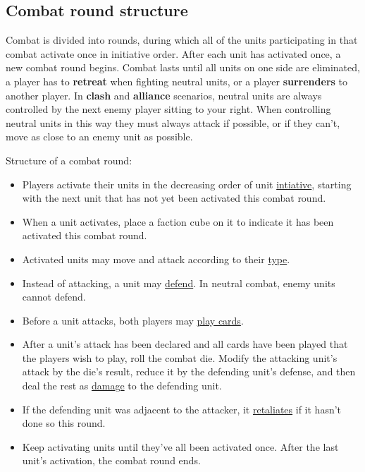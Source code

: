 \subsection*{Combat round structure}
Combat is divided into rounds, during which all of the units participating in that combat activate once in initiative order.
After each unit has activated once, a new combat round begins.
Combat lasts until all units on one side are eliminated, a player has to \textbf{retreat} when fighting neutral units, or a player \textbf{surrenders} to another player.
In \textbf{clash} and \textbf{alliance} scenarios, neutral units are always controlled by the next enemy player sitting to your right.
When controlling neutral units in this way they must always attack if possible, or if they can't, move as close to an enemy unit as possible.\par
Structure of a combat round:
\begin{itemize}
  \item Players activate their units in the decreasing order of unit \hyperlink{Initiative}{intiative}, starting with the next unit that has not yet been activated this combat round.
  \item When a unit activates, place a faction cube on it to indicate it has been activated this combat round.
  \item Activated units may move and attack according to their \hyperlink{Unittype}{type}.
  \item Instead of attacking, a unit may \hyperlink{Defend}{defend}.
In neutral combat, enemy units cannot defend.
  \item Before a unit attacks, both players may \hyperlink{CombatCards}{play cards}.
  \item After a unit's attack has been declared and all cards have been played that the players wish to play, roll the combat die.
    Modify the attacking unit's attack by the die's result, reduce it by the defending unit's defense, and then deal the rest as \hyperlink{HP}{damage} to the defending unit.
  \item If the defending unit was adjacent to the attacker, it \hyperlink{Retaliate}{retaliates} if it hasn't done so this round.
  \item Keep activating units until they've all been activated once.
After the last unit's activation, the combat round ends.
\end{itemize}
